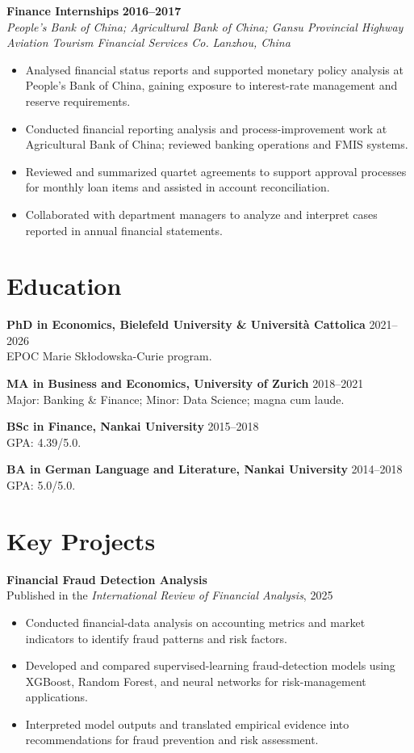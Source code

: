 \documentclass[a4paper,11pt]{article}
\newcommand{\role}[4]{%
  \textbf{#1} \hfill \textbf{#2}\\
  \textit{#3} \hfill \textit{#4}\par
}
\newcommand{\project}[2]{%
  \textbf{#1}\\[-1pt]
  \textcolor{muted}{\small #2}\par
}
\begin{document}
\role{Finance Internships}{2016--2017}{People's Bank of China; Agricultural Bank of China; Gansu Provincial Highway Aviation Tourism Financial Services Co.}{Lanzhou, China}
\begin{itemize}
  \item Analysed financial status reports and supported monetary policy analysis at People's Bank of China, gaining exposure to interest-rate management and reserve requirements.
  \item Conducted financial reporting analysis and process-improvement work at Agricultural Bank of China; reviewed banking operations and FMIS systems.
  \item Reviewed and summarized quartet agreements to support approval processes for monthly loan items and assisted in account reconciliation.
  \item Collaborated with department managers to analyze and interpret cases reported in annual financial statements.
\end{itemize}

 


\section{Education}
\textbf{PhD in Economics, Bielefeld University \& Universit\`a Cattolica} \hfill 2021--2026\\
EPOC Marie Sk\l odowska-Curie program.

\textbf{MA in Business and Economics, University of Zurich} \hfill 2018--2021\\
Major: Banking \& Finance; Minor: Data Science; magna cum laude.

\textbf{BSc in Finance, Nankai University} \hfill 2015--2018\\
GPA: 4.39/5.0.

\textbf{BA in German Language and Literature, Nankai University} \hfill 2014--2018\\
GPA: 5.0/5.0.

\section{Key Projects}
\project{Financial Fraud Detection Analysis}{Published in the \textit{International Review of Financial Analysis}, 2025}
\begin{itemize}
  \item Conducted financial-data analysis on accounting metrics and market indicators to identify fraud patterns and risk factors.
  \item Developed and compared supervised-learning fraud-detection models using XGBoost, Random Forest, and neural networks for risk-management applications.
  \item Interpreted model outputs and translated empirical evidence into recommendations for fraud prevention and risk assessment.
\end{itemize}
\end{document}
